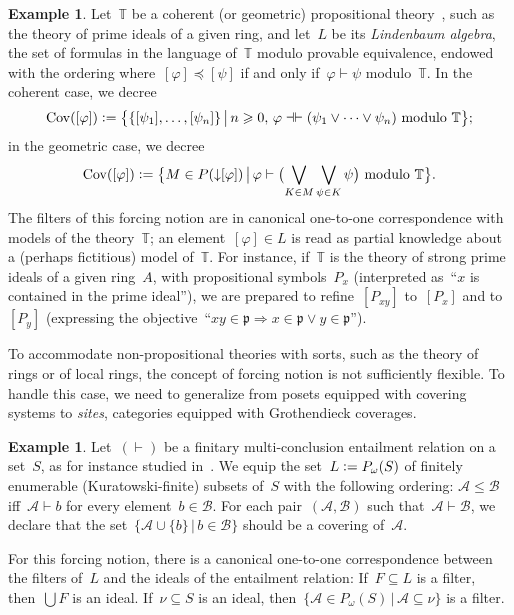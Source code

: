 \documentclass[com,11pt,crcready]{iosart2x}
\theoremstyle{definition}
\newtheorem{example}[definition]{Example}
\theoremstyle{plain}
\theoremstyle{remark}
\newcommand{\?}{\,{:}\,}
\newcommand{\ppp}{\mathfrak{p}}
\newcommand{\TT}{\mathbb{T}}
\newcommand{\defeq}{\vcentcolon=}
\newcommand{\Cov}{\mathrm{Cov}}
\renewcommand{\_}{\mathpunct{.}\,}
\begin{document}
\begin{example}\label{ex:notion-lindenbaum}Let~$\TT$ be a coherent (or
geometric) propositional theory~\cite[Definition~D1.1.3]{johnstone:elephant},
such as the theory of prime ideals of a given ring, and let~$L$ be its
\emph{Lindenbaum algebra}, the set of formulas in the language of~$\TT$ modulo
provable equivalence, endowed with the ordering where~$[\varphi] \preceq
[\psi]$ if and only if~$\varphi \vdash \psi$ modulo~$\TT$. In the coherent
case, we decree
\[ \Cov([\varphi]) \defeq \bigl\{ \{ [\psi_1],\ldots,[\psi_n] \} \,\big|\,
  n \geq 0,\,\text{$\varphi \dashv\vdash (\psi_1 \vee \cdots \vee \psi_n)$ modulo~$\TT$}
  \bigr\}; \]
in the geometric case, we decree
\[ \Cov([\varphi]) \defeq \bigl\{ M \in P({\downarrow}[\varphi]) \,\big|\,
  \text{$\varphi \vdash \bigl(\bigvee_{K \in M} \bigvee_{\psi \in K} \psi\bigr)$ modulo~$\TT$}
  \bigr\}. \]
The filters of this forcing notion are in canonical one-to-one correspondence
with models of the theory~$\TT$; an element~$[\varphi] \in L$ is read as
partial knowledge about a (perhaps fictitious) model of~$\TT$.
For instance, if~$\TT$ is the theory of strong
prime ideals of a given ring~$A$, with propositional symbols~$P_x$
(interpreted as~``$x$ is contained in the prime ideal''), we are prepared to
refine~$[P_{xy}]$ to~$[P_x]$ and to~$[P_y]$ (expressing the objective~``$xy \in
\ppp \Rightarrow x \in \ppp \vee y \in \ppp$'').

To accommodate non-propositional theories with sorts, such as the theory of
rings or of local rings, the concept of forcing notion is not
sufficiently flexible. To handle this case, we need to generalize from posets
equipped with covering systems to \emph{sites}, categories equipped with
Grothendieck coverages.
\end{example}

\begin{example}\label{ex:notion-entrel}Let~$({\vdash})$ be a finitary
multi-conclusion entailment relation on a set~$S$, as for instance studied
in~\cite{rinaldi-wessel:cut}. We equip the set~$L \defeq P_\omega(S)$ of
finitely enumerable (Kuratowski-finite) subsets of~$S$ with the following
ordering: $\mathcal{A} \leq \mathcal{B}$ iff~$\mathcal{A} \vdash b$ for every
element~$b \in \mathcal{B}$. For each pair~$(\mathcal{A},\mathcal{B})$ such
that~$\mathcal{A} \vdash \mathcal{B}$, we declare that the set~$\{ \mathcal{A}
\cup \{ b \} \,|\, b \in \mathcal{B} \}$ should be a covering of~$\mathcal{A}$.

For this forcing notion, there is a canonical one-to-one correspondence between
the filters of~$L$ and the ideals of the entailment relation: If~$F \subseteq
L$ is a filter, then~$\bigcup F$ is an ideal. If~$\nu \subseteq S$ is an ideal,
then~$\{ \mathcal{A} \in P_\omega(S) \,|\, \mathcal{A} \subseteq \nu \}$ is a
filter.
\end{example}
\end{document}
